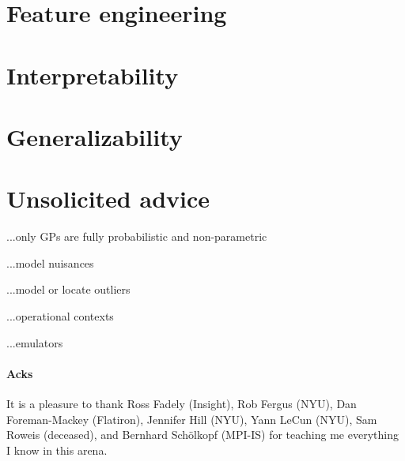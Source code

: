 \documentclass[12pt, letterpaper]{article}
\begin{document}
\section{Feature engineering}

\section{Interpretability}

\section{Generalizability}

\section{Unsolicited advice}

...only GPs are fully probabilistic and non-parametric

...model nuisances

...model or locate outliers

...operational contexts

...emulators

\paragraph{Acks}
It is a pleasure to thank
  Ross Fadely (Insight),
  Rob Fergus (NYU),
  Dan Foreman-Mackey (Flatiron),
  Jennifer Hill (NYU),
  Yann LeCun (NYU),
  Sam Roweis (deceased),
  and
  Bernhard Sch\"olkopf (MPI-IS)
for teaching me everything I know in this arena.
\end{document}

